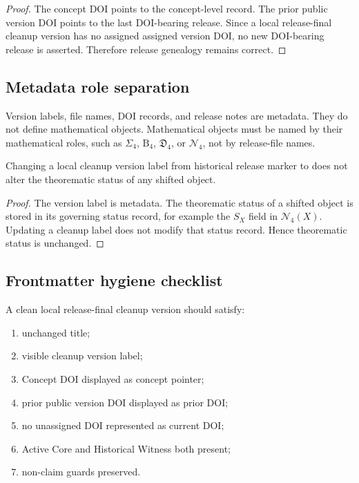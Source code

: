 \begin{proof}
The concept DOI points to the concept-level record. The prior public version
DOI points to the last DOI-bearing release. Since a local release-final cleanup version has
no assigned assigned version DOI, no new DOI-bearing release is asserted. Therefore
release genealogy remains correct.
\end{proof}

\subsection{Metadata role separation}
\label{subsec:v407-metadata-role-separation}

\begin{definition}
\label{def:v407-metadata-role-separation}
Version labels, file names, DOI records, and release notes are metadata. They
do not define mathematical objects. Mathematical objects must be named by their
mathematical roles, such as $\Sigma_4$, $\mathrm B_4$, $\mathfrak D_4$, or
$\mathcal N_4$, not by release-file names.
\end{definition}

\begin{proposition}
\label{prop:v407-metadata-does-not-alter-theorematic-status}
Changing a local cleanup version label from historical release marker  to  does not alter
the theorematic status of any shifted object.
\end{proposition}

\begin{proof}
The version label is metadata. The theorematic status of a shifted object is stored
in its governing status record, for example the $S_X$ field in
$\mathcal N_4(X)$. Updating a cleanup label does not modify that status
record. Hence theorematic status is unchanged.
\end{proof}

\subsection{Frontmatter hygiene checklist}
\label{subsec:v407-frontmatter-hygiene-checklist}

\begin{definition}
\label{def:v407-frontmatter-hygiene-checklist}
A clean local release-final cleanup version should satisfy:
\begin{enumerate}[leftmargin=*]
 \item unchanged title;
 \item visible cleanup version label;
 \item Concept DOI displayed as concept pointer;
 \item prior public version DOI displayed as prior DOI;
 \item no unassigned DOI represented as current DOI;
 \item Active Core and Historical Witness both present;
 \item non-claim guards preserved.
\end{enumerate}
\end{definition}

